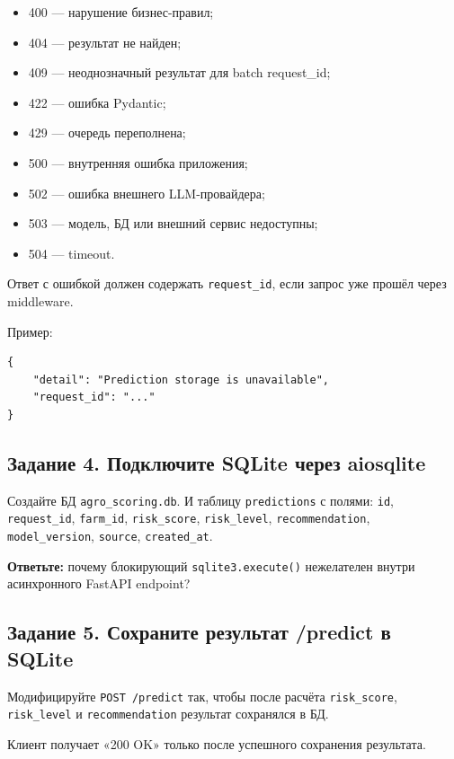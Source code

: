 \documentclass[12pt,a4paper]{article}
\begin{document}
\begin{itemize}
    \item 400 — нарушение бизнес-правил;
    \item 404 — результат не найден;
    \item 409 — неоднозначный результат для batch request\_id;
    \item 422 — ошибка Pydantic;
    \item 429 — очередь переполнена;
    \item 500 — внутренняя ошибка приложения;
    \item 502 — ошибка внешнего LLM-провайдера;
    \item 503 — модель, БД или внешний сервис недоступны;
    \item 504 — timeout.
\end{itemize}

Ответ с ошибкой должен содержать \texttt{request\_id}, если запрос уже прошёл через middleware.

Пример:

\begin{lstlisting}[caption={Пример ответа с ошибкой}]
{
    "detail": "Prediction storage is unavailable",
    "request_id": "..."
}
\end{lstlisting}

\subsection{Задание 4. Подключите SQLite через aiosqlite}

Создайте БД \texttt{agro\_scoring.db}. И таблицу \texttt{predictions} с полями: \texttt{id}, \texttt{request\_id}, \texttt{farm\_id}, \texttt{risk\_score}, \texttt{risk\_level}, \texttt{recommendation}, \texttt{model\_version}, \texttt{source}, \texttt{created\_at}.

\textbf{Ответьте:} почему блокирующий \texttt{sqlite3.execute()} нежелателен внутри асинхронного FastAPI endpoint?

\subsection{Задание 5. Сохраните результат /predict в SQLite}

Модифицируйте \texttt{POST /predict} так, чтобы после расчёта \texttt{risk\_score}, \texttt{risk\_level} и \texttt{recommendation} результат сохранялся в БД.

Клиент получает «200 OK» только после успешного сохранения результата.
\end{document}
